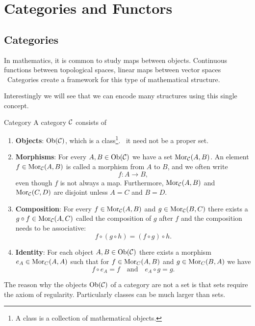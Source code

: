 \chapter{Categories and Functors}
\section{Categories}

In mathematics, it is common to study maps between objects.
Continuous functions between topological spaces, linear maps between vector spaces \etc\
Categories create a framework for this type of mathematical structure.

Interestingly we will see that we can encode many structures using this single concept.

\begin{definition}{Category \cite[Section~1.2]{Roman2017}}{}
A category $\mathcal{C}$ consists of
\begin{enumerate}
    \item \textbf{Objects}: $\mathrm {Ob}(\mathcal{C})$, which is a class\footnote{A class is a collection of mathematical objects.}. \Ie\ it need not be a proper set.
    
    \item \textbf{Morphisms}: For every $A, B \in \mathrm {Ob}(\mathcal{C})$ we have a set $\mathrm {Mor}_{\mathcal{C}}(A,B)$. An element $f \in \mathrm {Mor}_{\mathcal{C}}(A,B)$ is called a morphism from $A$ to $B$, and we often write 
    $$
    f: A \to B,
    $$
    even though $f$ is not always a map. Furthermore, $\mathrm {Mor}_{\mathcal{C}}(A,B)$ and $\mathrm {Mor}_{\mathcal{C}}(C,D)$ are disjoint unless $A = C$ and $B = D$.
    
    \item \textbf{Composition}: For every $f \in \mathrm {Mor}_{\mathcal{C}}(A,B)$ and $g \in \mathrm {Mor}_{\mathcal{C}}(B,C)$ there exists a $g \circ f \in \mathrm {Mor}_{\mathcal{C}}(A,C)$ called the composition of $g$ after $f$ and the composition needs to be associative: 
    $$
    f \circ (g \circ h) = (f \circ g) \circ h.
    $$

    \item \textbf{Identity}: For each object $A,B \in \mathrm {Ob}(\mathcal{C})$ there exists a morphism $e_A \in \mathrm {Mor}_C(A,A)$ such that for $f \in \mathrm {Mor}_C(A,B)$ and $g \in \mathrm {Mor}_C(B,A)$ we have
    $$
    f \circ e_A = f \quad \text{and} \quad e_A \circ g = g.
    $$
\end{enumerate}
\end{definition}

The reason why the objects $\mathrm {Ob}(\mathcal{C})$ of a category are not a set is that sets require the axiom of regularity. Particularly classes can be much larger than sets.

